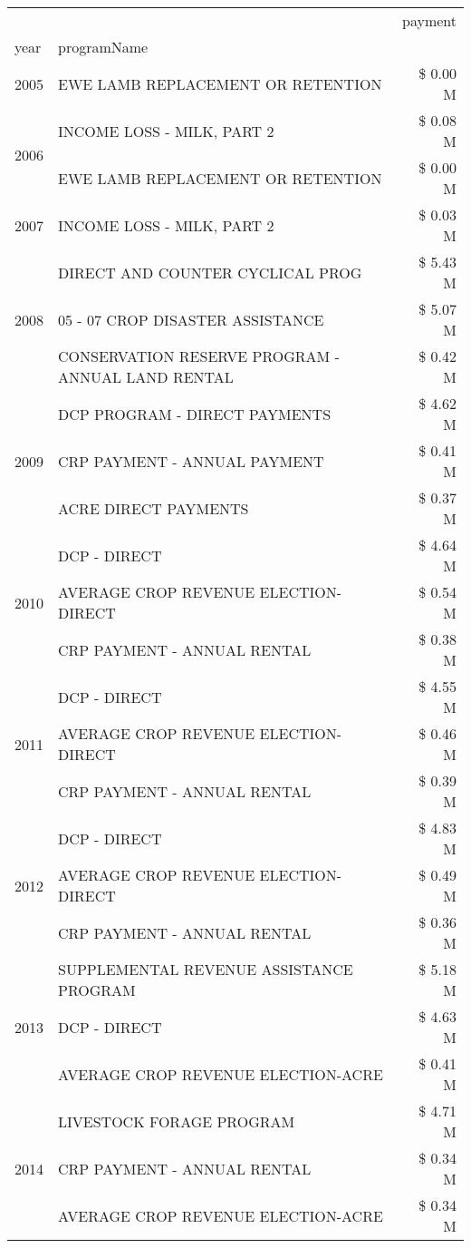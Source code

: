 \begin{tabular}{llr}
\toprule
 &  & payment \\
year & programName &  \\
\midrule
2005 & EWE LAMB REPLACEMENT OR RETENTION & \$ 0.00 M \\
\cline{1-3}
\multirow[t]{2}{*}{2006} & INCOME LOSS - MILK, PART 2 & \$ 0.08 M \\
 & EWE LAMB REPLACEMENT OR RETENTION & \$ 0.00 M \\
\cline{1-3}
2007 & INCOME LOSS - MILK, PART 2 & \$ 0.03 M \\
\cline{1-3}
\multirow[t]{3}{*}{2008} & DIRECT AND COUNTER CYCLICAL PROG & \$ 5.43 M \\
 & 05 - 07 CROP DISASTER ASSISTANCE & \$ 5.07 M \\
 & CONSERVATION RESERVE PROGRAM - ANNUAL LAND RENTAL & \$ 0.42 M \\
\cline{1-3}
\multirow[t]{3}{*}{2009} & DCP PROGRAM - DIRECT PAYMENTS & \$ 4.62 M \\
 & CRP PAYMENT - ANNUAL PAYMENT & \$ 0.41 M \\
 & ACRE DIRECT PAYMENTS & \$ 0.37 M \\
\cline{1-3}
\multirow[t]{3}{*}{2010} & DCP - DIRECT & \$ 4.64 M \\
 & AVERAGE CROP REVENUE ELECTION-DIRECT & \$ 0.54 M \\
 & CRP PAYMENT - ANNUAL RENTAL & \$ 0.38 M \\
\cline{1-3}
\multirow[t]{3}{*}{2011} & DCP - DIRECT & \$ 4.55 M \\
 & AVERAGE CROP REVENUE ELECTION-DIRECT & \$ 0.46 M \\
 & CRP PAYMENT - ANNUAL RENTAL & \$ 0.39 M \\
\cline{1-3}
\multirow[t]{3}{*}{2012} & DCP - DIRECT & \$ 4.83 M \\
 & AVERAGE CROP REVENUE ELECTION-DIRECT & \$ 0.49 M \\
 & CRP PAYMENT - ANNUAL RENTAL & \$ 0.36 M \\
\cline{1-3}
\multirow[t]{3}{*}{2013} & SUPPLEMENTAL REVENUE ASSISTANCE PROGRAM & \$ 5.18 M \\
 & DCP - DIRECT & \$ 4.63 M \\
 & AVERAGE CROP REVENUE ELECTION-ACRE & \$ 0.41 M \\
\cline{1-3}
\multirow[t]{3}{*}{2014} & LIVESTOCK FORAGE PROGRAM & \$ 4.71 M \\
 & CRP PAYMENT - ANNUAL RENTAL & \$ 0.34 M \\
 & AVERAGE CROP REVENUE ELECTION-ACRE & \$ 0.34 M \\

\end{tabular}
